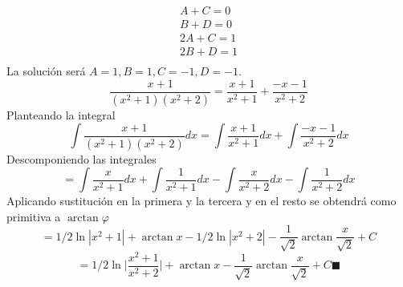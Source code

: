 \documentclass[10pt,twoside]{SelfArx} %
\begin{document}
\begin{enumerate}
\begin{enumerate}
\begin{enumerate}
\[\begin{array}{cccc}
A+C=0\\
B+D=0\\
2A+C=1\\
2B+D=1\\
\end{array}
 \]
 La solución será $ A=1, B=1, C=-1, D=-1 $.
 \[ \dfrac{x+1}{(x^{2}+1)(x^{2}+2)}=\dfrac{x+1}{x^{2}+1}+\dfrac{-x-1}{x^{2}+2}  \]
 Planteando la integral
 \begin{equation}
  \int\dfrac{x+1}{(x^{2}+1)(x^{2}+2)}dx=\int\dfrac{x+1}{x^{2}+1}dx+\int\dfrac{-x-1}{x^{2}+2}dx
 \end{equation}
 Descomponiendo las integrales
 \begin{equation}
=\int\dfrac{x}{x^{2}+1}dx+\int\dfrac{1}{x^{2}+1}dx-\int\dfrac{x}{x^{2}+2}dx-\int\dfrac{1}{x^{2}+2}dx
 \end{equation}
 Aplicando sustitución en la primera y la tercera y en el resto se obtendrá como primitiva a $ \arctan \varphi $
 \begin{equation}
 =1/2\ln|x^{2}+1|+\arctan x-1/2\ln|x^{2}+2|-\dfrac{1}{\sqrt{2}}\arctan\dfrac{x}{\sqrt{2}}+C
 \end{equation}
 \begin{equation}
 =1/2\ln\bigg|\dfrac{x^{2}+1}{x^{2}+2}\bigg|+\arctan x-\dfrac{1}{\sqrt{2}}\arctan\dfrac{x}{\sqrt{2}}+C\blacksquare
 \end{equation}
 
\end{enumerate}

\end{enumerate}





\end{enumerate}
\end{document}
